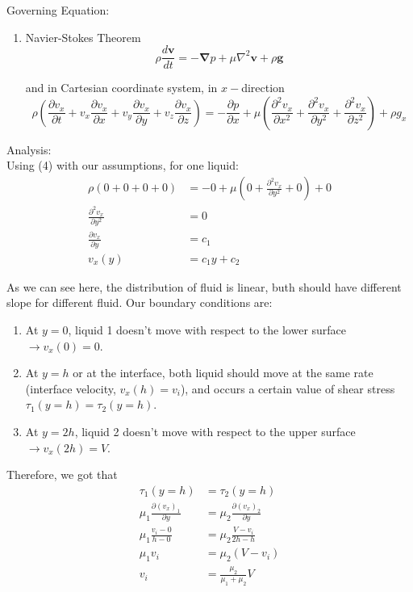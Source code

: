 \documentclass[10pt]{article}
\begin{document}
Governing Equation:
\begin{enumerate}
    \item Navier-Stokes Theorem
    \begin{equation}
        \rho \frac{d \mathbf{v}}{dt} = -\mathbf{\nabla}p + \mu \nabla^2 \mathbf{v} + \rho \mathbf{g}
    \end{equation}

    and in Cartesian coordinate system, in $x-$direction
    \begin{equation}
        \rho \left( \frac{\partial v_x}{\partial t} + v_x \frac{\partial v_x}{\partial x} + v_y \frac{\partial v_x}{\partial y} + v_z \frac{\partial v_x}{\partial z} \right) = -\frac{\partial p}{\partial x} + \mu \left(\frac{\partial^2 v_x}{\partial x^2} + \frac{\partial^2 v_x}{\partial y^2} + \frac{\partial^2 v_x}{\partial z^2} \right) + \rho g_x
    \end{equation}
\end{enumerate}

\hfill

Analysis: \\
Using (4) with our assumptions, for one liquid:
\begin{align*}
    \rho(0 + 0 + 0 + 0) &= -0 + \mu(0 + \frac{\partial^2 v_x}{\partial y^2} + 0) + 0 \\
    \frac{\partial^2 v_x}{\partial y^2} &= 0 \\
    \frac{\partial v_x}{\partial y} &= c_1 \\
    v_x(y) &= c_1 y + c_2
\end{align*}

As we can see here, the distribution of fluid is linear, buth should have different slope for different fluid. Our boundary conditions are:
\begin{enumerate}
    \item At $y = 0$, liquid 1 doesn't move with respect to the lower surface $\rightarrow v_x(0) = 0$.
    \item At $y = h$ or at the interface, both liquid should move at the same rate (interface velocity, $v_x(h) = v_i$), and occurs a certain value of shear stress $\tau_1 (y = h) = \tau_2(y = h)$.
    \item At $y = 2h$, liquid 2 doesn't move with respect to the upper surface $\rightarrow v_x(2h) = V$.
\end{enumerate}

Therefore, we got that
\begin{align*}
    \tau_1 (y = h) &= \tau_2 (y = h) \\
    \mu_1 \frac{\partial (v_x)_1}{\partial y} &= \mu_2 \frac{\partial (v_x)_2}{\partial y} \\
    \mu_1 \frac{v_i - 0}{h - 0} &= \mu_2 \frac{V - v_i}{2h - h} \\
    \mu_1 v_i &= \mu_2 (V - v_i) \\
    v_i &= \frac{\mu_2}{\mu_1 + \mu_2} V
\end{align*}
\end{document}
